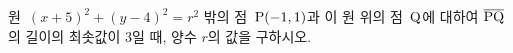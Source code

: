 원~$(x+5)^2+(y-4)^2=r^2$ 밖의 점~$\mathrm{P}(-1{,}\mkern3mu\mathopen{}1)$과 이 원 위의 점~$\mathrm{Q}$에 대하여 $\overline{\mathrm{PQ}}$의 길이의 최솟값이 $3$일 때, 양수 $r$의 값을 구하시오.

